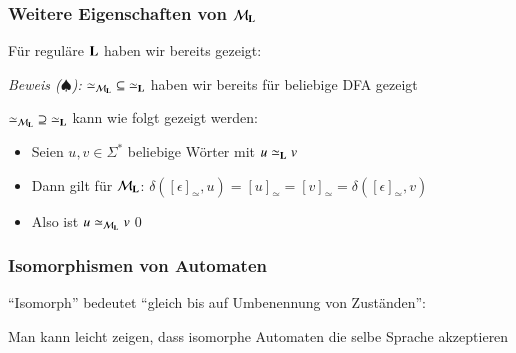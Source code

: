 \documentclass[onlymath]{beamer}
\begin{document}
\begin{frame}[t]\frametitle{Weitere Eigenschaften von $\mathcal{M}_{\textbf{\textcolor{black}{L}}}$}

Für reguläre $\textbf{\textcolor{black}{L}}$ haben wir bereits gezeigt:
%
\medskip

\emph{Beweis ($\spadesuit$):} ${\simeq_{\mathcal{M}_{\textbf{\textcolor{black}{L}}}}}\subseteq{\simeq_{\textbf{\textcolor{black}{L}}}}$ haben wir bereits für beliebige DFA gezeigt
\medskip

${\simeq_{\mathcal{M}_{\textbf{\textcolor{black}{L}}}}}\supseteq{\simeq_{\textbf{\textcolor{black}{L}}}}$ kann wie folgt gezeigt werden:
\begin{itemize}
\item Seien $u,v\in\Sigma^*$ beliebige Wörter mit $u\simeq_{\textbf{\textcolor{black}{L}}} v$
\item Dann gilt für $\mathcal{M}_{\textbf{\textcolor{black}{L}}}$: $\delta([\epsilon]_\simeq,u)=[u]_\simeq=[v]_\simeq=\delta([\epsilon]_\simeq,v)$
\item Also ist $u\simeq_{\mathcal{M}_{\textbf{\textcolor{black}{L}}}} v$\qed
\end{itemize}

\end{frame}

\begin{frame}\frametitle{Isomorphismen von Automaten}

"`Isomorph"' bedeutet "`gleich bis auf Umbenennung von Zuständen"':\bigskip

%
\bigskip

Man kann leicht zeigen, dass isomorphe Automaten die selbe Sprache akzeptieren
\bigskip


\end{frame}
\end{document}
